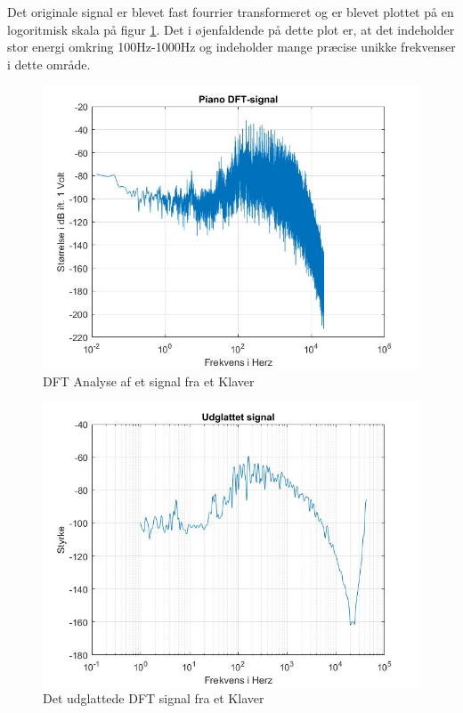 Det originale signal er blevet fast fourrier transformeret og er blevet plottet på en logoritmisk skala på figur \ref{fig:Klaver DFT}. Det i øjenfaldende på dette plot er, at det indeholder stor energi omkring 100Hz-1000Hz og indeholder mange præcise unikke frekvenser i dette område. 
\begin{figure}[H]
	\centering
	\includegraphics[width=140mm]{figures/Piano/DFT.jpg}
	\caption{DFT Analyse af et signal fra et Klaver}
	\label{fig:Klaver DFT}
\end{figure}

\begin{figure}[H]
	\centering
	\includegraphics[width=140mm]{figures/Piano/udglattet.jpg}
	\caption{Det udglattede DFT signal fra et Klaver}
	\label{fig:Klaver udglattet}
\end{figure}
\newpage

